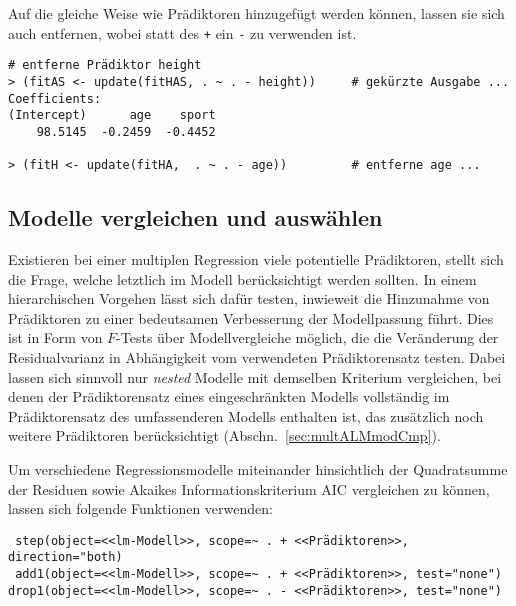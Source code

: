 Auf die gleiche Weise wie Prädiktoren hinzugefügt werden können, lassen sie sich auch entfernen, wobei statt des \lstinline!+! ein \lstinline!-! zu verwenden ist.
\begin{lstlisting}
# entferne Prädiktor height
> (fitAS <- update(fitHAS, . ~ . - height))     # gekürzte Ausgabe ...
Coefficients:
(Intercept)      age    sport
    98.5145  -0.2459  -0.4452

> (fitH <- update(fitHA,  . ~ . - age))         # entferne age ...
\end{lstlisting}

\subsection{Modelle vergleichen und auswählen}
\label{sec:regrCmp}

Existieren bei einer multiplen Regression viele potentielle Prädiktoren, stellt sich die Frage, welche letztlich im Modell berücksichtigt werden sollten. In einem hierarchischen Vorgehen lässt sich dafür testen, inwieweit die Hinzunahme von Prädiktoren zu einer bedeutsamen Verbesserung der Modellpassung führt. Dies ist in Form von $F$-Tests über Modellvergleiche möglich, die die Veränderung der Residualvarianz in Abhängigkeit vom verwendeten Prädiktorensatz testen. Dabei lassen sich sinnvoll nur \emph{nested} Modelle mit demselben Kriterium vergleichen, bei denen der Prädiktorensatz eines eingeschränkten Modells vollständig im Prädiktorensatz des umfassenderen Modells enthalten ist, das zusätzlich noch weitere Prädiktoren berücksichtigt (Abschn.\ \ref{sec:multALMmodCmp}).

Um verschiedene Regressionsmodelle miteinander hinsichtlich der Quadratsumme der Residuen sowie Akaikes Informationskriterium AIC vergleichen zu können, lassen sich folgende Funktionen verwenden:
\begin{lstlisting}
 step(object=<<lm-Modell>>, scope=~ . + <<Prädiktoren>>, direction="both)
 add1(object=<<lm-Modell>>, scope=~ . + <<Prädiktoren>>, test="none")
drop1(object=<<lm-Modell>>, scope=~ . - <<Prädiktoren>>, test="none")
\end{lstlisting}

